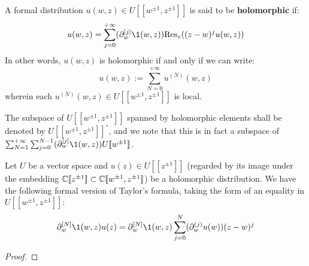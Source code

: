         \begin{definition} \label{def: holomorphic_formal_distributions}
            A formal distribution $u(w, z) \in U[\![w^{\pm 1}, z^{\pm 1}]\!]$ is said to be \textbf{holomorphic} if:
                $$u(w, z) = \sum_{j = 0}^{+\infty} ( \del_w^{[j]} \1(w, z) ) \Res_z( (z - w)^j u(w, z) )$$
            In other words, $u(w, z)$ is holomorphic if and only if we can write:
                $$u(w, z) := \sum_{N = 0}^{+\infty} u^{(N)}(w, z)$$
            wherein each $u^{(N)}(w, z) \in U[\![w^{\pm 1}, z^{\pm 1}]\!]$ is local.

            The subspace of $U[\![w^{\pm 1}, z^{\pm 1}]\!]$ spanned by holomorphic elements shall be denoted by $U[\![w^{\pm 1}, z^{\pm 1}]\!]^{\circ}$, and we note that this is in fact a subspace of $\sum_{N = 1}^{+\infty} \sum_{j = 0}^{N - 1} ( \del_w^{[j]} \1(w, z) ) U[\![w^{\pm 1}]\!]$.
        \end{definition}
        \begin{lemma} \label{lemma: taylor_seres_of_holomorphic_distributions}
            Let $U$ be a vector space and $u(z) \in U[\![z^{\pm 1}]\!]$ (regarded by its image under the embedding $\mathbb{C}[\![z^{\pm 1}]\!] \subset \mathbb{C}[\![w^{\pm 1}, z^{\pm 1}]\!]$) be a holomorphic distribution. We have the following formal version of Taylor's formula, taking the form of an equality in $U[\![w^{\pm 1}, z^{\pm 1}]\!]$:
                $$\del_w^{[N]} \1(w, z) u(z) = \del_w^{[N]} \1(w, z) \sum_{j = 0}^N (\del_w^{(j)} u(w)) (z - w)^j$$
        \end{lemma} 
            \begin{proof}
                
            \end{proof}
        
